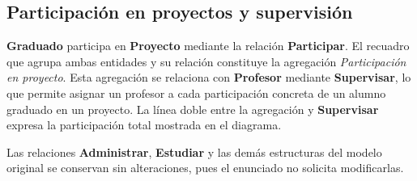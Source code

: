 \subsection{Participación en proyectos y supervisión}

\textbf{Graduado} participa en \textbf{Proyecto} mediante la relación
\textbf{Participar}. El recuadro que agrupa ambas entidades y su relación
constituye la agregación \emph{Participación en proyecto}. Esta agregación se
relaciona con \textbf{Profesor} mediante \textbf{Supervisar}, lo que permite
asignar un profesor a cada participación concreta de un alumno graduado en un
proyecto. La línea doble entre la agregación y \textbf{Supervisar} expresa la
participación total mostrada en el diagrama.

Las relaciones \textbf{Administrar}, \textbf{Estudiar} y las demás estructuras
del modelo original se conservan sin alteraciones, pues el enunciado no solicita
modificarlas.
